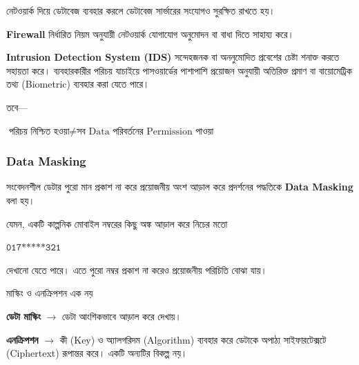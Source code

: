 নেটওয়ার্ক দিয়ে ডেটাবেজ ব্যবহার করলে ডেটাবেজ সার্ভারের সংযোগও
সুরক্ষিত রাখতে হয়।

\textbf{Firewall} নির্ধারিত নিয়ম অনুযায়ী নেটওয়ার্ক যোগাযোগ
অনুমোদন বা বাধা দিতে সাহায্য করে।

\textbf{Intrusion Detection System (IDS)} সন্দেহজনক বা
অননুমোদিত প্রবেশের চেষ্টা শনাক্ত করতে সহায়তা করে। ব্যবহারকারীর পরিচয় যাচাইয়ে পাসওয়ার্ডের পাশাপাশি প্রয়োজন অনুযায়ী
অতিরিক্ত প্রমাণ বা বায়োমেট্রিক তথ্য (Biometric) ব্যবহার করা যেতে পারে।

তবে---

\par\smallskip
\noindent\(\displaystyle \boxed{
\text{পরিচয় নিশ্চিত হওয়া}
\neq
\text{সব Data পরিবর্তনের Permission পাওয়া}
}\)\par\smallskip



\subsubsection{Data Masking}

\begin{definitionbox}{}

সংবেদনশীল ডেটার পুরো মান প্রকাশ না করে প্রয়োজনীয় অংশ
আড়াল করে প্রদর্শনের পদ্ধতিকে \textbf{Data Masking} বলা হয়।

\end{definitionbox}

যেমন, একটি কাল্পনিক মোবাইল নম্বরের কিছু অঙ্ক আড়াল করে নিচের মতো

\par\smallskip
\noindent\(\displaystyle \texttt{017*****321}\)\par\smallskip

দেখানো যেতে পারে। এতে পুরো নম্বর প্রকাশ না করেও প্রয়োজনীয় পরিচিতি বোঝা যায়।

\begin{mistakebox}{মাস্কিং ও এনক্রিপশন এক নয়}

\textbf{ডেটা মাস্কিং} $\rightarrow$ ডেটা আংশিকভাবে আড়াল করে দেখায়।

\textbf{এনক্রিপশন} $\rightarrow$ কী (Key) ও অ্যালগরিদম (Algorithm) ব্যবহার করে ডেটাকে
অপাঠ্য সাইফারটেক্সটে (Ciphertext) রূপান্তর করে। একটি অন্যটির বিকল্প নয়।

\end{mistakebox}



